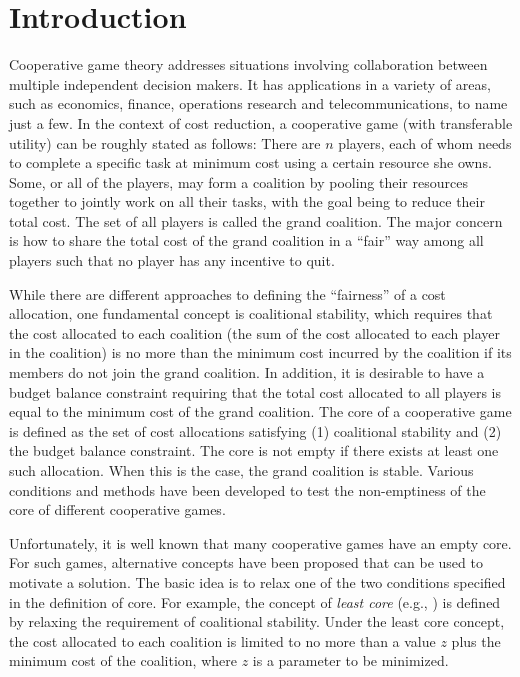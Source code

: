 \documentclass[ijoc,nonblindrev]{informs3} %
\begin{document}

\section{Introduction}
Cooperative game theory addresses situations involving collaboration between multiple independent decision makers. It has applications in a variety of areas, such as economics, finance, operations research and telecommunications, to name just a few. In the context of cost reduction, a cooperative game (with transferable utility) can be roughly stated as follows: There are $n$ players, each of whom needs to complete a specific task at minimum cost using a certain resource she owns. Some, or all of the players, may form a coalition by pooling their resources together to jointly work on all their tasks, with the goal being to reduce their total cost. The set of all players is called the grand coalition. The major concern is how to share the total cost of the grand coalition in a ``fair'' way among all players such that no player has any incentive to quit.

While there are different approaches to defining the ``fairness'' of a cost allocation, one fundamental concept is coalitional stability, which requires that the cost allocated to each coalition (the sum of the cost allocated to each player in the coalition) is  no more than the minimum cost incurred by the coalition if its members do not join the grand coalition. In addition, it is desirable to have a budget balance constraint requiring that the total cost allocated to all players is equal to the minimum cost of the grand coalition.
The core of a cooperative game is defined as the set of cost allocations satisfying (1) coalitional stability and (2) the budget balance constraint.
The core is not empty if there exists at least one such allocation. When this is the case, the grand coalition is stable. Various conditions and methods have been developed to test the non-emptiness of the core of different cooperative games.

Unfortunately, it is well known that many cooperative games have an empty core. For such games, alternative concepts have been proposed that can be used to motivate a solution. The basic idea is to relax one of the two conditions specified in the definition of core. For example, the concept of {\em least core} (e.g., \citealt{maschler1979geometric,Kern2003,Uhan2010,Uhan2013LeastCore}) is defined by relaxing the requirement of coalitional stability.  Under the least core concept, the cost allocated to each coalition is limited to no more than a value $z$ plus the minimum cost of the coalition, where $z$ is a parameter to be minimized. %
\end{document}
